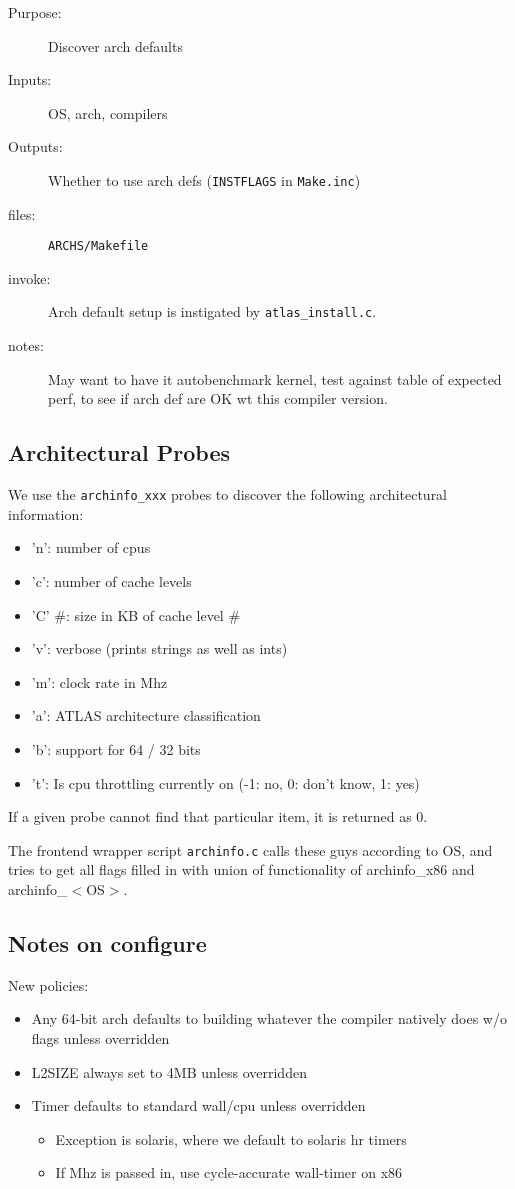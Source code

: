 \documentclass[11pt]{article}
\begin{document}
\begin{enumerate}
\begin{description}
   \item [Purpose:] Discover arch defaults
   \item [Inputs:]  OS, arch, compilers
   \item [Outputs:] Whether to use arch defs ({\tt INSTFLAGS} in {\tt Make.inc})
   \item [files:] {\tt ARCHS/Makefile}
   \item [invoke:] Arch default setup is instigated by {\tt atlas\_install.c}.
   \item [notes:] May want to have it autobenchmark kernel, test against
         table of expected perf, to see if arch def are OK wt this compiler
         version.
   \end{description}
\end{enumerate}

\subsection{Architectural Probes}
\label{sec-archProbe}
{\samepage
We use the {\tt archinfo\_xxx} probes to discover the following architectural
information:
\begin{itemize}
\item 'n': number of cpus
\item 'c': number of cache levels
\item 'C' \#: size in KB of cache level \#
\item 'v': verbose (prints strings as well as ints)
\item 'm': clock rate in Mhz
\item 'a': ATLAS architecture classification 
\item 'b': support for 64 / 32 bits
\item 't': Is cpu throttling currently on (-1: no, 0: don't know, 1: yes)
\end{itemize}
If a given probe cannot find that particular item, it is returned as 0.
}

The frontend wrapper script {\tt archinfo.c} calls these
guys according to OS, and tries to get all flags filled in with union of
functionality of archinfo\_x86 and archinfo\_$<$OS$>$.

\subsection{Notes on configure}
New policies:
\begin{itemize}
\item Any 64-bit arch defaults to building whatever the compiler natively does
      w/o flags unless overridden
\item L2SIZE always set to 4MB unless overridden
\item Timer defaults to standard wall/cpu unless overridden
   \begin{itemize}
   \item Exception is solaris, where we default to solaris hr timers
   \item If Mhz is passed in, use cycle-accurate wall-timer on x86
   \end{itemize}
\end{itemize}
\end{document}
